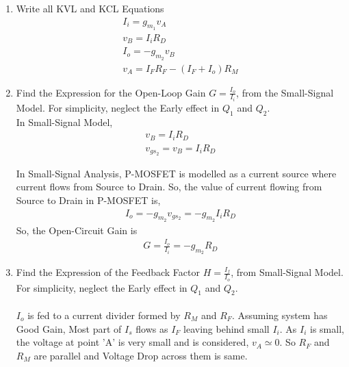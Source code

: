 \begin{enumerate}[label=\thesubsection.\arabic*.,ref=\thesubsection.\theenumi]
\item Write all KVL and KCL Equations\\
\solution
\begin{align}
I_{i} = g_{m_{1}}v_{A}\\
v_{B} = I_{i}R_{D}\\
I_{o} = -g_{m_{2}}v_{B}\\
v_{A} = I_{F}R_{F} - (I_{F} + I_{o})R_{M}
\end{align}

\item Find the Expression for the Open-Loop Gain $G=\frac{I_{o}}{I_{i}}$, from the Small-Signal Model. For simplicity, neglect the Early effect in $Q_{1}$ and $Q_{2}$.\\
\solution
In Small-Signal Model,
\begin{align}
v_{B} = I_{i}R_{D}\\
v_{gs_{2}} = v_{B} = I_{i}R_{D}
\end{align}

In Small-Signal Analysis, P-MOSFET is modelled as a current source where current flows from Source to Drain. So, the value of current flowing from Source to Drain in P-MOSFET is,
\begin{align}
I_{o} =  -g_{m_{2}}v_{gs_{2}} = -g_{m_{2}}I_{i}R_{D}
\end{align}
So, the Open-Circuit Gain is
\begin{align}
G = \frac{I_{o}}{I_{i}} =  -g_{m_{2}}R_{D}
\end{align}

\item Find the Expression of the Feedback Factor $H = \frac{I_{f}}{I_{o}}$, from Small-Signal Model. For simplicity, neglect the Early effect in $Q_{1}$ and $Q_{2}$.\\
\solution\\
$I_{o}$ is fed to a current divider formed by $R_{M}$ and $R_{F}$. Assuming system has Good Gain, Most part of $I_{s}$ flows as $I_{F}$ leaving behind small $I_{i}$. As $I_{i}$ is small, the voltage at point 'A' is very small and is considered, $v_{A} \simeq 0$. So $R_{F}$ and $R_{M}$ are parallel and Voltage Drop across them is same.


\end{enumerate}
